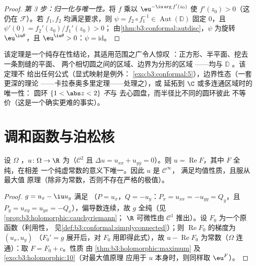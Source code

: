 \begin{proof}
\emph{第 3 步：归一化与唯一性。}将 $f$ 乘以
$\eu^{-\iu\arg f'(z_0)}$ 使 $f'(z_0) > 0$（这仍在
$\mathcal F$）。若 $f_1, f_2$ 均满足要求，则 $\psi =
f_2\circ f_1^{-1} \in \operatorname{Aut}(\mathbb D)$ 固定
$0$，且 $\psi'(0) = f_2'(z_0)/f_1'(z_0) > 0$；
由\cref{thm:b3:conformal:autdisc}，$\psi$ 为旋转
$\eu^{\iu\theta}$，且 $\eu^{\iu\theta} > 0$：$\psi =
\mathrm{id}$。
\end{proof}

\begin{remark}\label{rem:b3:conformal:rmtscope}
该定理是一个纯存在性结论，其适用范围之广令人惊叹
：正方形、半平面、挖去一条割缝的平面、
两个相切圆之间的区域、边界为分形的区域
——均与 $\mathbb D$ 。该定理不
给出任何公式（显式映射是例外：
\cref{exo:b3:conformal:5}），边界性态（一套更深的理论
——卡拉泰奥多里定理——处理之），或
延拓到 $\C$ 或多连通区域时的唯一性：
圆环 $\{1 < \abs z < 2\}$ \emph{不}与
去心圆盘，而半径比不同的圆环彼此
不等价（这是一个确实更难的事实）。
\end{remark}

\section{调和函数与泊松核}

\begin{proposition}\label{prop:b3:conformal:harmonicholo}
设 $\Omega$ ，$u \colon \Omega \to \R$
为（$\mathcal C^2$ 且
$\Delta u = u_{xx} + u_{yy} = 0$）。则 $u =
\operatorname{Re}F$，其中 $F$ 全纯，在相差
一个纯虚常数的意义下唯一。因此 $u$ 是 $\mathcal C^\infty$，
满足均值性质，且服从最大值
原理（除非为常数，否则不存在严格的极值）。
\end{proposition}

\begin{proof}
$g = u_x - \iu u_y$ 满足
（$P = u_x$，$Q = -u_y$：$P_x = u_{xx} = -u_{yy} = Q_y$，且
$P_y = u_{xy} = u_{yx} = -Q_x$），偏导数连续，故 $g$
全纯（见\cref{prop:b3:holomorphic:cauchyriemann}；
$\R$ 可微性由 $\mathcal C^1$ 推出）。设 $F_0$
为一个原函数（利用性，
见\cref{def:b3:conformal:simplyconnected}）；则
$\operatorname{Re}F_0$ 的梯度为 $(u_x, u_y)$
（$F_0' = g$ 展开后，对
$F_0$ 用即得此式），故 $u - \operatorname{Re}F_0$ 为常数（$\Omega$
连通）：取 $F = F_0 + c$。性质
由 \cref{thm:b3:holomorphic:maximum} 及
\cref{exo:b3:holomorphic:10}（对最大值原理
应用于 $u$ 本身时，则同样取 $\eu^{F}$）。
\end{proof}

